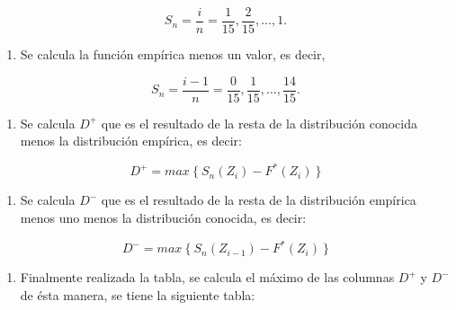 \documentclass[
  a4paper,
  oneside,
  openany]{book}
\providecommand{\tightlist}{%
  \setlength{\itemsep}{0pt}\setlength{\parskip}{0pt}}
\begin{document}
\[S_{n}= \frac{i}{n}=\frac{1}{15},\frac{2}{15}, \ldots, 1. \]

\begin{enumerate}
\def\labelenumi{\arabic{enumi})}
\setcounter{enumi}{4}
\tightlist
\item
  Se calcula la función empírica menos un valor, es decir,
\end{enumerate}

\[S_{n}= \frac{i-1}{n}=\frac{0}{15},\frac{1}{15}, \ldots, \frac{14}{15}.\]

\begin{enumerate}
\def\labelenumi{\arabic{enumi})}
\setcounter{enumi}{5}
\tightlist
\item
  Se calcula \(D^+\) que es el resultado de la resta de la distribución conocida menos la distribución empírica, es decir:
\end{enumerate}

\[D^+= max \ \{ \ S_{n}(Z_{i})-F^*(Z_{i}) \ \}\]

\begin{enumerate}
\def\labelenumi{\arabic{enumi})}
\setcounter{enumi}{6}
\tightlist
\item
  Se calcula \(D^-\) que es el resultado de la resta de la distribución empírica menos uno menos la distribución conocida, es decir:
\end{enumerate}

\[D^-= max \  \{\ S_{n}(Z_{i-1})-F^*(Z_{i}) \ \}\]

\begin{enumerate}
\def\labelenumi{\arabic{enumi})}
\setcounter{enumi}{7}
\tightlist
\item
  Finalmente realizada la tabla, se calcula el máximo de las columnas \(D^+\) y \(D^-\) de ésta manera, se tiene la siguiente tabla:
\end{enumerate}
\end{document}
